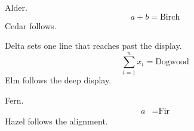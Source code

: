 \documentclass{article}
\begin{document}
Alder.
\[ a + b = \text{Birch} \]
Cedar follows.

Delta sets one line that reaches past the display.
\[ \sum_{i=1}^{n} x_{i} = \text{Dogwood} \]
Elm follows the deep display.

Fern.
\begin{align*} a &= \text{Fir} \end{align*}
Hazel follows the alignment.
\end{document}
